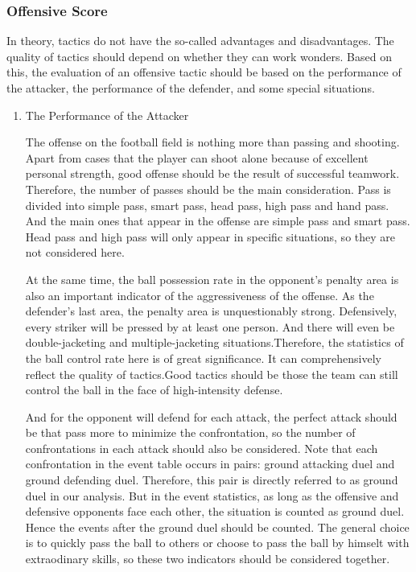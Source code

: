 \documentclass{mcmthesis}
\begin{document}
\subsubsection{Offensive Score}
	In theory, tactics do not have the so-called advantages and disadvantages. The quality of tactics should depend on whether they can work wonders.  Based on this, the evaluation of an offensive tactic should be based on the performance of the attacker, the performance of the defender, and some special situations.
	\begin{enumerate}
	\item The Performance of the Attacker
	
	\qquad The offense on the football field is nothing more than passing and shooting. Apart from cases that the player can shoot alone because of excellent personal strength, good offense should be the result of successful teamwork.  Therefore, the number of passes should be the main consideration. Pass is divided into simple pass, smart pass, head pass, high pass and hand pass. And the main ones that appear in the offense are simple pass and smart pass. Head pass and high pass will only appear in specific situations, so they are not considered here.

	\qquad At the same time, the ball possession rate in the opponent's penalty area is also an important indicator of the aggressiveness of the offense. As the defender's last area, the penalty area is unquestionably strong.  Defensively, every striker will be pressed by at least one person.  And there will even be double-jacketing and multiple-jacketing situations.Therefore, the statistics of the ball control rate here is of great significance. It can comprehensively reflect the quality of tactics.Good tactics should be those the team can still control the ball in the face of high-intensity defense.

	\qquad And for the opponent will defend for each attack, the perfect attack should be that pass more to minimize the confrontation, so the number of confrontations in each attack should also be considered.  Note that each confrontation in the event table occurs in pairs: ground attacking duel and ground defending duel.  Therefore, this pair is directly referred to as ground duel in our analysis.  But in the event statistics, as long as the offensive and defensive opponents face each other, the situation is counted as ground duel.  Hence the events after the ground duel should be counted. The general choice is to quickly pass the ball to others or choose to pass the ball by himselt with extraodinary skills, so these two indicators should be considered together.


\end{enumerate}
\end{document}
